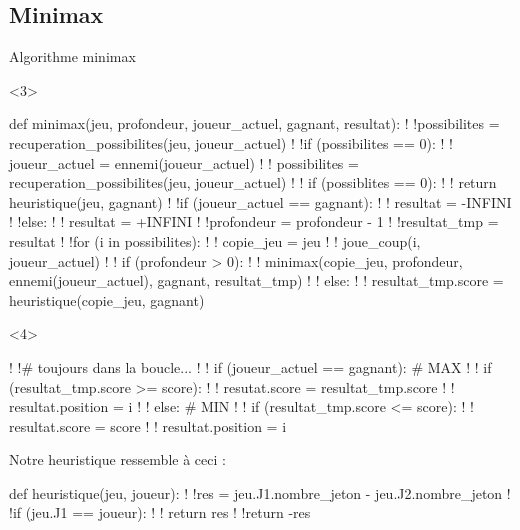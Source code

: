 \documentclass{beamer}
\begin{document}
\subsection*{Minimax}
\begin{frame}[fragile]{Algorithme minimax}
    \begin{onlyenv}<3>
        \begin{pseudocode}
            def minimax(jeu, profondeur, joueur_actuel, gagnant, resultat):
            !  !possibilites = recuperation_possibilites(jeu, joueur_actuel)
            !  !if (possibilites == 0):
            !  !    joueur_actuel = ennemi(joueur_actuel)
            !  !    possibilites = recuperation_possibilites(jeu, joueur_actuel)
            !  !    if (possiblites == 0):
            !  !        return heuristique(jeu, gagnant)
            !  !if (joueur_actuel == gagnant):
            !  !    resultat = -INFINI
            !  !else:
            !  !    resultat = +INFINI
            !  !profondeur = profondeur - 1
            !  !resultat_tmp = resultat
            !  !for (i in possibilites):
            !  !    copie_jeu = jeu
            !  !    joue_coup(i, joueur_actuel)
            !  !    if (profondeur > 0):
            !  !        minimax(copie_jeu, profondeur, ennemi(joueur_actuel), gagnant, resultat_tmp)
            !  !    else:
            !  !        resultat_tmp.score = heuristique(copie_jeu, gagnant)
        \end{pseudocode}
    \end{onlyenv}
    \begin{onlyenv}<4>
        \vspace{5mm}
        \begin{pseudocode}
            !  !# toujours dans la boucle...
            !  !    if (joueur_actuel == gagnant): # MAX
            !  !        if (resultat_tmp.score >= score):
            !  !            resutat.score = resultat_tmp.score
            !  !            resultat.position = i
            !  !    else: # MIN
            !  !        if (resultat_tmp.score <= score):
            !  !            resultat.score = score
            !  !            resultat.position = i
        \end{pseudocode}
        Notre heuristique ressemble à ceci :
        \begin{pseudocode}
            def heuristique(jeu, joueur):
            !  !res = jeu.J1.nombre_jeton - jeu.J2.nombre_jeton
            !  !if (jeu.J1 == joueur):
            !  !    return res
            !  !return -res
        \end{pseudocode}

\end{onlyenv}
\end{frame}
\end{document}
